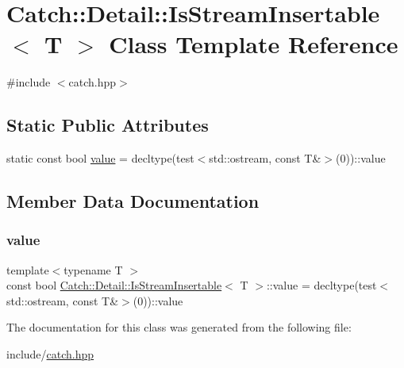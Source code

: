 \hypertarget{classCatch_1_1Detail_1_1IsStreamInsertable}{}\section{Catch\+:\+:Detail\+:\+:Is\+Stream\+Insertable$<$ T $>$ Class Template Reference}
\label{classCatch_1_1Detail_1_1IsStreamInsertable}


{\ttfamily \#include $<$catch.\+hpp$>$}

\subsection*{Static Public Attributes}
\begin{DoxyCompactItemize}
\item 
static const bool \mbox{\hyperlink{classCatch_1_1Detail_1_1IsStreamInsertable_a42818b09ae5851126a70ee263769e309}{value}} = decltype(test$<$std\+::ostream, const T\&$>$(0))\+::value
\end{DoxyCompactItemize}


\subsection{Member Data Documentation}
\mbox{\label{classCatch_1_1Detail_1_1IsStreamInsertable_a42818b09ae5851126a70ee263769e309}} 
\subsubsection{\texorpdfstring{value}{value}}
{\footnotesize\ttfamily template$<$typename T $>$ \\
const bool \mbox{\hyperlink{classCatch_1_1Detail_1_1IsStreamInsertable}{Catch\+::\+Detail\+::\+Is\+Stream\+Insertable}}$<$ T $>$\+::value = decltype(test$<$std\+::ostream, const T\&$>$(0))\+::value\hspace{0.3cm}{\ttfamily [static]}}



The documentation for this class was generated from the following file\+:\begin{DoxyCompactItemize}
\item 
include/\mbox{\hyperlink{catch_8hpp}{catch.\+hpp}}\end{DoxyCompactItemize}
